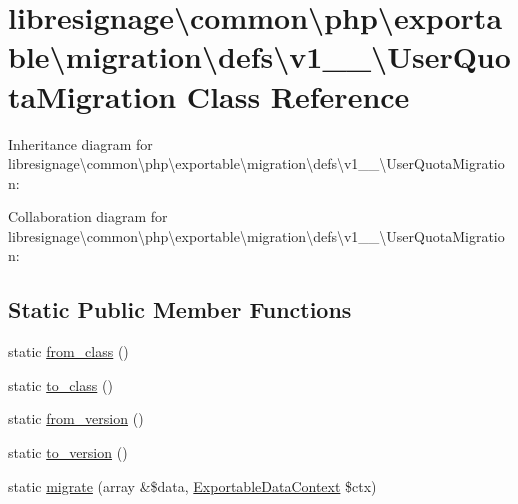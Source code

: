 \hypertarget{classlibresignage_1_1common_1_1php_1_1exportable_1_1migration_1_1defs_1_1v1__0__0_1_1UserQuotaMigration}{}\section{libresignage\textbackslash{}common\textbackslash{}php\textbackslash{}exportable\textbackslash{}migration\textbackslash{}defs\textbackslash{}v1\+\_\+\_\textbackslash{}User\+Quota\+Migration Class Reference}
\label{classlibresignage_1_1common_1_1php_1_1exportable_1_1migration_1_1defs_1_1v1__0__0_1_1UserQuotaMigration}


Inheritance diagram for libresignage\textbackslash{}common\textbackslash{}php\textbackslash{}exportable\textbackslash{}migration\textbackslash{}defs\textbackslash{}v1\+\_\+\_\textbackslash{}User\+Quota\+Migration\+:


Collaboration diagram for libresignage\textbackslash{}common\textbackslash{}php\textbackslash{}exportable\textbackslash{}migration\textbackslash{}defs\textbackslash{}v1\+\_\+\_\textbackslash{}User\+Quota\+Migration\+:
\subsection*{Static Public Member Functions}
\begin{DoxyCompactItemize}
\item 
static \hyperlink{classlibresignage_1_1common_1_1php_1_1exportable_1_1migration_1_1defs_1_1v1__0__0_1_1UserQuotaMigration_ac6dac99f910ea3433abf47f0b6a641e3}{from\+\_\+class} ()
\item 
static \hyperlink{classlibresignage_1_1common_1_1php_1_1exportable_1_1migration_1_1defs_1_1v1__0__0_1_1UserQuotaMigration_afab87f3c95d902cd93f5932b88bec5df}{to\+\_\+class} ()
\item 
static \hyperlink{classlibresignage_1_1common_1_1php_1_1exportable_1_1migration_1_1defs_1_1v1__0__0_1_1UserQuotaMigration_aaf2b212b9d9507d0772bbbd5d11edcf1}{from\+\_\+version} ()
\item 
static \hyperlink{classlibresignage_1_1common_1_1php_1_1exportable_1_1migration_1_1defs_1_1v1__0__0_1_1UserQuotaMigration_a66e81971271ea69fbb979d832f0298ac}{to\+\_\+version} ()
\item 
static \hyperlink{classlibresignage_1_1common_1_1php_1_1exportable_1_1migration_1_1defs_1_1v1__0__0_1_1UserQuotaMigration_ad09b86e387ff586bd59c301306975d9e}{migrate} (array \&\$data, \hyperlink{classlibresignage_1_1common_1_1php_1_1exportable_1_1ExportableDataContext}{Exportable\+Data\+Context} \$ctx)
\end{DoxyCompactItemize}


